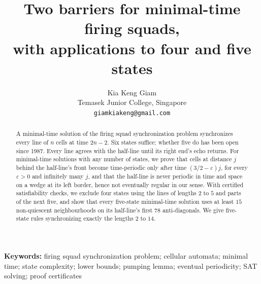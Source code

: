 \documentclass[11pt,a4paper]{article}
\title{Two barriers for minimal-time firing squads,\\ with applications to four and five states}
\author{Kia Keng Giam\\[0.4ex]
  \small Temasek Junior College, Singapore\\
  \small \texttt{giamkiakeng@gmail.com}}
\date{}
\theoremstyle{definition}
\theoremstyle{remark}
\begin{document}
\maketitle
\thispagestyle{plain}

\begin{abstract}
\noindent A minimal-time solution of the firing squad synchronization problem
synchronizes every line of $n$ cells at time $2n-2$. Six states suffice; whether
five do has been open since 1987. Every line
agrees with the half-line until its right end's echo returns. For minimal-time
solutions with any number of states, we prove that cells at distance $j$ behind
the half-line's front become time-periodic only after time $(3/2-\varepsilon)j$,
for every $\varepsilon>0$ and infinitely many $j$, and that the half-line is
never periodic in time and space on a wedge at its left border, hence not
eventually regular in our sense. With certified
satisfiability checks, we exclude four states using the lines of lengths $2$ to
$5$ and parts of the next five, and show that every five-state minimal-time
solution uses at least $15$ non-quiescent neighbourhoods on its half-line's
first $78$ anti-diagonals. We give five-state rules synchronizing
exactly the lengths $2$ to $14$.
\end{abstract}

\noindent\textbf{Keywords:} firing squad synchronization problem; cellular
automata; minimal time; state complexity; lower bounds; pumping lemma; eventual
periodicity; SAT solving; proof certificates










\end{document}
